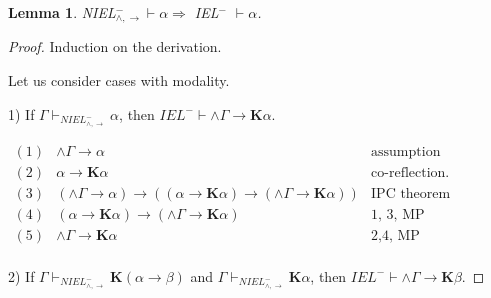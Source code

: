 \documentclass[a4paper]{article}
\newtheorem{lemma}{Lemma}
\begin{document}
  \vspace{\baselineskip}

  \begin{lemma}
    NIEL$^{-}_{\land, \to} \vdash \alpha \Rightarrow$ IEL$^{-}$ $\vdash \alpha$.
  \end{lemma}

  \begin{proof}
Induction on the derivation.

  \vspace{\baselineskip}

Let us consider cases with modality.

\vspace{\baselineskip}

1) If $\Gamma \vdash_{NIEL^{-}_{\land, \to}} \alpha$, then $IEL^{-} \vdash \wedge \Gamma \rightarrow \textbf{K}\alpha$.

$\begin{array}{lll}
(1)& \wedge \Gamma \rightarrow \alpha & \text{assumption}\\
(2)& \alpha \rightarrow \textbf{K}\alpha &\text{co-reflection.}\\
(3)& (\wedge \Gamma \rightarrow \alpha) \rightarrow ((\alpha \rightarrow \textbf{K}\alpha) \rightarrow (\wedge \Gamma \rightarrow \textbf{K}\alpha))&\text{IPC theorem}\\
(4) &(\alpha \rightarrow \textbf{K}\alpha) \rightarrow (\wedge \Gamma \rightarrow \textbf{K}\alpha) &\text{1, 3, MP}\\
(5) &\wedge \Gamma \rightarrow \textbf{K}\alpha &\text{2,4, MP}\\
\end{array}$

\vspace{\baselineskip}

2) If $\Gamma \vdash_{NIEL^{-}_{\land, \to}} \textbf{K}(\alpha \to \beta)$ and $\Gamma \vdash_{NIEL^{-}_{\land, \to}} \textbf{K}\alpha$, then $IEL^{-} \vdash \wedge \Gamma \rightarrow \textbf{K}\beta$.


\end{proof}
\end{document}
